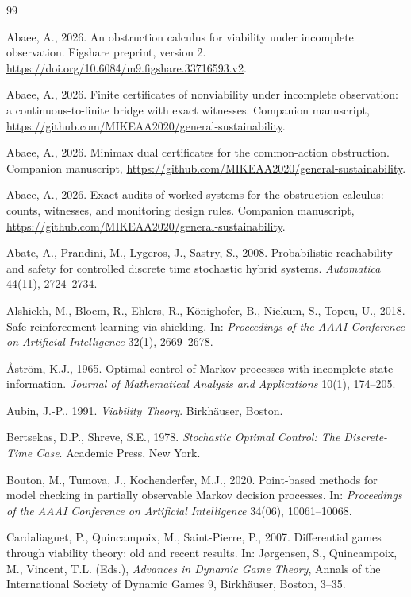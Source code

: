 \begin{thebibliography}{99}\footnotesize

 Abaee, A., 2026. An obstruction calculus for viability under incomplete observation. Figshare preprint, version 2. \url{https://doi.org/10.6084/m9.figshare.33716593.v2}.

 Abaee, A., 2026. Finite certificates of nonviability under incomplete observation: a continuous-to-finite bridge with exact witnesses. Companion manuscript, \url{https://github.com/MIKEAA2020/general-sustainability}.

 Abaee, A., 2026. Minimax dual certificates for the common-action obstruction. Companion manuscript, \url{https://github.com/MIKEAA2020/general-sustainability}.

 Abaee, A., 2026. Exact audits of worked systems for the obstruction calculus: counts, witnesses, and monitoring design rules. Companion manuscript, \url{https://github.com/MIKEAA2020/general-sustainability}.

 Abate, A., Prandini, M., Lygeros, J., Sastry, S., 2008. Probabilistic reachability and safety for controlled discrete time stochastic hybrid systems. \emph{Automatica} 44(11), 2724--2734.

 Alshiekh, M., Bloem, R., Ehlers, R., K\"onighofer, B., Niekum, S., Topcu, U., 2018. Safe reinforcement learning via shielding. In: \emph{Proceedings of the AAAI Conference on Artificial Intelligence} 32(1), 2669--2678.

 \AA str\"om, K.J., 1965. Optimal control of Markov processes with incomplete state information. \emph{Journal of Mathematical Analysis and Applications} 10(1), 174--205.

 Aubin, J.-P., 1991. \emph{Viability Theory}. Birkh\"auser, Boston.

 Bertsekas, D.P., Shreve, S.E., 1978. \emph{Stochastic Optimal Control: The Discrete-Time Case}. Academic Press, New York.

 Bouton, M., Tumova, J., Kochenderfer, M.J., 2020. Point-based methods for model checking in partially observable Markov decision processes. In: \emph{Proceedings of the AAAI Conference on Artificial Intelligence} 34(06), 10061--10068.

 Cardaliaguet, P., Quincampoix, M., Saint-Pierre, P., 2007. Differential games through viability theory: old and recent results. In: J{\o}rgensen, S., Quincampoix, M., Vincent, T.L. (Eds.), \emph{Advances in Dynamic Game Theory}, Annals of the International Society of Dynamic Games 9, Birkh\"auser, Boston, 3--35.


\end{thebibliography}
